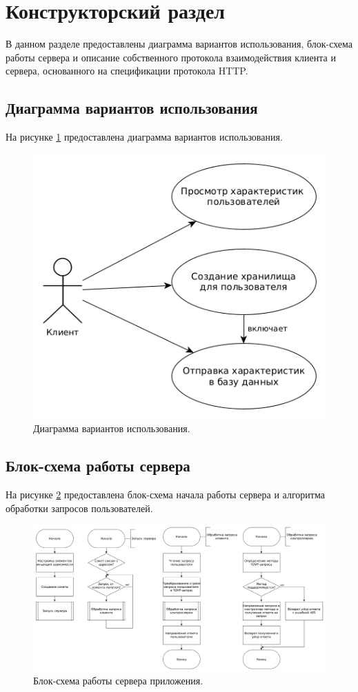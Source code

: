 \section{Конструкторский раздел}
В данном разделе предоставлены диаграмма вариантов использования, блок-схема работы сервера и описание собственного протокола взаимодействия клиента и сервера, основанного на спецификации протокола HTTP.

\subsection{Диаграмма вариантов использования}
На рисунке \ref{fig:useCase} предоставлена диаграмма вариантов использования.

\begin{figure}[hbtp]
	\centering
	\includegraphics[scale=0.5]{img/useCase.png}
	\caption{Диаграмма вариантов использования. }
	\label{fig:useCase}
\end{figure}

\subsection{Блок-схема работы сервера}
На рисунке \ref{fig:serverScheme} предоставлена блок-схема начала работы сервера и алгоритма обработки запросов пользователей.

\begin{figure}[hbtp]
	\centering
	\includegraphics[width=\textwidth]{img/serverScheme.png}
	\caption{Блок-схема работы сервера приложения. }
	\label{fig:serverScheme}
\end{figure}

